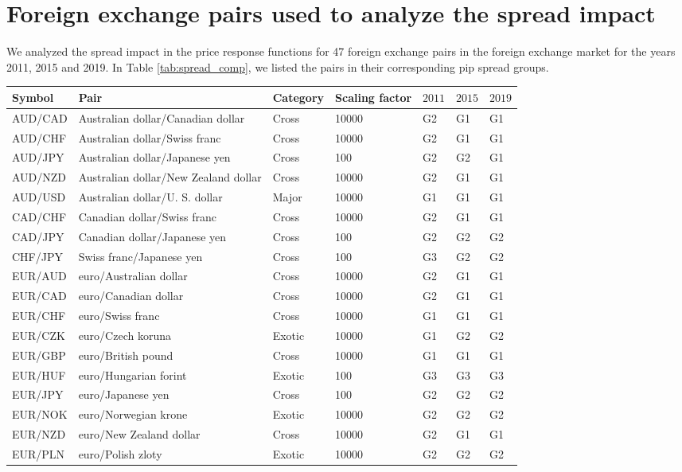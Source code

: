 \section{Foreign exchange pairs used to analyze the spread impact}
\label{app:fx_pairs_spread}

We analyzed the spread impact in the price response functions for 47 foreign
exchange pairs in the foreign exchange market for the years 2011, 2015 and
2019. In Table \ref{tab:spread_comp}, we listed the pairs in their corresponding pip spread groups.

\begin{table*}
\begin{center}
\begin{centering}
    \begin{threeparttable}
    \caption{Foreign exchange pairs used in Sect. \ref{sec:spread_impact}.}
    \label{tab:spread_comp}
    \begin{tabular}{lllllll}
    \hline
    Symbol & Pair & Category & Scaling factor & $2011$ & $2015$ & $2019$\tabularnewline
    \hline
    AUD/CAD & Australian dollar/Canadian dollar & Cross & 10000 & G2 & G1 & G1\tabularnewline
    AUD/CHF & Australian dollar/Swiss franc & Cross & 10000 & G2 & G1 & G1\tabularnewline
    AUD/JPY & Australian dollar/Japanese yen & Cross & 100 & G2 & G2 & G1\tabularnewline
    AUD/NZD & Australian dollar/New Zealand dollar & Cross & 10000 & G2 & G1 & G1\tabularnewline
    AUD/USD & Australian dollar/U. S. dollar & Major & 10000 & G1 & G1 & G1\tabularnewline
    CAD/CHF & Canadian dollar/Swiss franc & Cross & 10000 & G2 & G1 & G1\tabularnewline
    CAD/JPY & Canadian dollar/Japanese yen & Cross & 100 & G2 & G2 & G2\tabularnewline
    CHF/JPY & Swiss franc/Japanese yen & Cross & 100 & G3 & G2 & G2\tabularnewline
    EUR/AUD & euro/Australian dollar & Cross & 10000 & G2 & G1 & G1\tabularnewline
    EUR/CAD & euro/Canadian dollar & Cross & 10000 & G2 & G1 & G1\tabularnewline
    EUR/CHF & euro/Swiss franc & Cross & 10000 & G1 & G1 & G1\tabularnewline
    EUR/CZK & euro/Czech koruna & Exotic & 10000 & G1 & G2 & G2\tabularnewline
    EUR/GBP & euro/British pound & Cross & 10000 & G1 & G1 & G1\tabularnewline
    EUR/HUF & euro/Hungarian forint & Exotic & 100 & G3 & G3 & G3\tabularnewline
    EUR/JPY & euro/Japanese yen & Cross & 100 & G2 & G2 & G2\tabularnewline
    EUR/NOK & euro/Norwegian krone & Exotic & 10000 & G2 & G2 & G2\tabularnewline
    EUR/NZD & euro/New Zealand dollar & Cross & 10000 & G2 & G1 & G1\tabularnewline
    EUR/PLN & euro/Polish zloty & Exotic & 10000 & G2 & G2 & G2\tabularnewline

\end{tabular}
\end{threeparttable}
\end{centering}
\end{center}
\end{table*}
